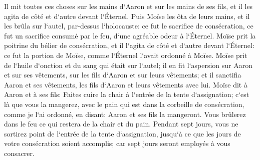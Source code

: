 \verse Il mit toutes ces choses sur les mains d`Aaron et sur les mains de ses fils, et il les agita de côté et d`autre devant l`Éternel. 
\verse Puis Moïse les ôta de leurs mains, et il les brûla sur l`autel, par-dessus l`holocauste: ce fut le sacrifice de consécration, ce fut un sacrifice consumé par le feu, d`une agréable odeur à l`Éternel. 
\verse Moïse prit la poitrine du bélier de consécration, et il l`agita de côté et d`autre devant l`Éternel: ce fut la portion de Moïse, comme l`Éternel l`avait ordonné à Moïse. 
\verse Moïse prit de l`huile d`onction et du sang qui était sur l`autel; il en fit l`aspersion sur Aaron et sur ses vêtements, sur les fils d`Aaron et sur leurs vêtements; et il sanctifia Aaron et ses vêtements, les fils d`Aaron et leurs vêtements avec lui. 
\verse Moïse dit à Aaron et à ses fils: Faites cuire la chair à l`entrée de la tente d`assignation; c`est là que vous la mangerez, avec le pain qui est dans la corbeille de consécration, comme je l`ai ordonné, en disant: Aaron et ses fils la mangeront. 
\verse Vous brûlerez dans le feu ce qui restera de la chair et du pain. 
\verse Pendant sept jours, vous ne sortirez point de l`entrée de la tente d`assignation, jusqu`à ce que les jours de votre consécration soient accomplis; car sept jours seront employés à vous consacrer. 
